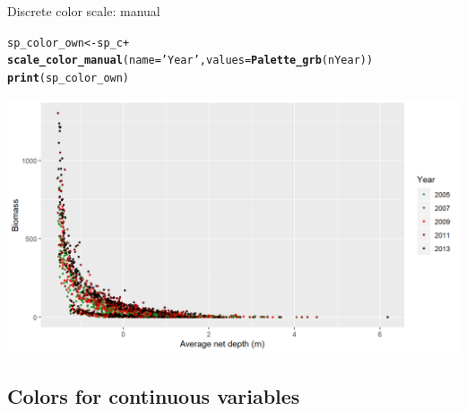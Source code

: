 \documentclass{beamer}\usepackage[]{graphicx}\usepackage[]{color}
\makeatletter
\newcommand{\hlstr}[1]{\textcolor[rgb]{0.192,0.494,0.8}{#1}}%
\newcommand{\hlopt}[1]{\textcolor[rgb]{0,0,0}{#1}}%
\newcommand{\hlstd}[1]{\textcolor[rgb]{0.345,0.345,0.345}{#1}}%
\newcommand{\hlkwb}[1]{\textcolor[rgb]{0.69,0.353,0.396}{#1}}%
\newcommand{\hlkwc}[1]{\textcolor[rgb]{0.333,0.667,0.333}{#1}}%
\newcommand{\hlkwd}[1]{\textcolor[rgb]{0.737,0.353,0.396}{\textbf{#1}}}%
\newenvironment{kframe}{%
 \def\at@end@of@kframe{}%
 \ifinner\ifhmode%
  \def\at@end@of@kframe{\end{minipage}}%
  \begin{minipage}{\columnwidth}%
 \fi\fi%
 \def\FrameCommand##1{\hskip\@totalleftmargin \hskip-\fboxsep
 \colorbox{shadecolor}{##1}\hskip-\fboxsep
     \hskip-\linewidth \hskip-\@totalleftmargin \hskip\columnwidth}%
 \MakeFramed {\advance\hsize-\width
   \@totalleftmargin\z@ \linewidth\hsize
   \@setminipage}}%
 {\par\unskip\endMakeFramed%
 \at@end@of@kframe}
\newenvironment{knitrout}{}{} %
\makeatother
\begin{document}
\begin{frame}[fragile]{Discrete color scale: manual}
\begin{knitrout}\footnotesize
{}\color{fgcolor}\begin{kframe}
\begin{alltt}
\hlstd{sp_color_own} \hlkwb{<-} \hlstd{sp_c} \hlopt{+}
  \hlkwd{scale_color_manual}\hlstd{(}\hlkwc{name}\hlstd{=}\hlstr{'Year'}\hlstd{,} \hlkwc{values} \hlstd{=} \hlkwd{Palette_grb}\hlstd{(nYear))}
\hlkwd{print}\hlstd{(sp_color_own)}
\end{alltt}
\end{kframe}

{\centering \includegraphics[width=.9\linewidth]{figure/sp_discrete_colorown-1} 

}



\end{knitrout}
\end{frame}


\subsection{Colors for continuous variables}
\end{document}
